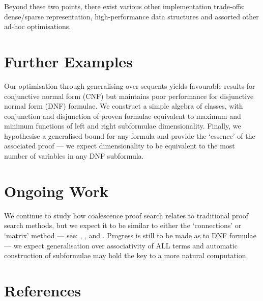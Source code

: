         Beyond these two points, there exist various other implementation trade-offs: dense/sparse representation, high-performance data structures and assorted other ad-hoc optimisations.

    \section*{Further Examples}
        Our optimisation through generalising over sequents yields favourable results for conjunctive normal form (CNF) but maintains poor performance for disjunctive normal form (DNF) formulae.
        We construct a simple algebra of classes, with conjunction and disjunction of proven formulae equivalent to maximum and minimum functions of left and right subformulae dimensionality.
        Finally, we hypothesise a generalised bound for any formula and provide the `essence' of the associated proof --- we expect dimensionality to be equivalent to the most number of variables in any DNF subformula.

    \section*{Ongoing Work}
        We continue to study how coalescence proof search relates to traditional proof search methods, but we expect it to be similar to either the `connections' or `matrix' method --- see: \citet{tableaux-for-logic-of-proofs}, \citet{matrices-with-connections}, \citet{connection-based-proof-method} and \citet{proving-by-matings}.
        Progress is still to be made as to DNF formulae --- we expect generalisation over associativity of ALL terms and automatic construction of subformulae may hold the key to a more natural computation.

    \section*{References}
        


